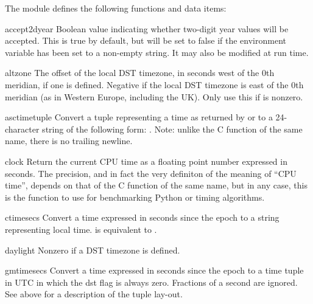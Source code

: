 The module defines the following functions and data items:


\begin{datadesc}{accept2dyear}
Boolean value indicating whether two-digit year values will be
accepted.  This is true by default, but will be set to false if the
environment variable  has been set to a non-empty
string.  It may also be modified at run time.
\end{datadesc}

\begin{datadesc}{altzone}
The offset of the local DST timezone, in seconds west of the 0th
meridian, if one is defined.  Negative if the local DST timezone is
east of the 0th meridian (as in Western Europe, including the UK).
Only use this if  is nonzero.
\end{datadesc}

\begin{funcdesc}{asctime}{tuple}
Convert a tuple representing a time as returned by 
or  to a 24-character string of the following form:
.  Note: unlike the C function of
the same name, there is no trailing newline.
\end{funcdesc}

\begin{funcdesc}{clock}{}
Return the current CPU time as a floating point number expressed in
seconds.  The precision, and in fact the very definiton of the meaning
of ``CPU time'', depends on that of the C function
of the same name, but in any case, this is the function to use for
benchmarking Python or timing algorithms.
\end{funcdesc}

\begin{funcdesc}{ctime}{secs}
Convert a time expressed in seconds since the epoch to a string
representing local time.   is equivalent to
.
\end{funcdesc}

\begin{datadesc}{daylight}
Nonzero if a DST timezone is defined.
\end{datadesc}

\begin{funcdesc}{gmtime}{secs}
Convert a time expressed in seconds since the epoch to a time tuple
in UTC in which the dst flag is always zero.  Fractions of a second are
ignored.  See above for a description of the tuple lay-out.
\end{funcdesc}

